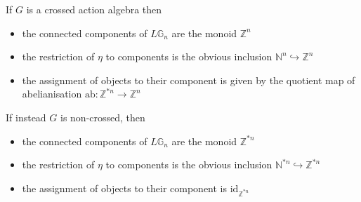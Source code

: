 \begin{cor}\label{crossconcomp} If $G$ is a crossed action algebra then
\begin{itemize} \itemsep0em
\item the connected components of $L\mathbb{G}_n$ are the monoid $\mathbb{Z}^n$
\item the restriction of $\eta$ to components is the obvious inclusion $\mathbb{N}^n \hookrightarrow \mathbb{Z}^n$
\item the assignment of objects to their component is given by the quotient map of abelianisation $\mathrm{ab}: \mathbb{Z}^{\ast n} \to \mathbb{Z}^n$
\end{itemize}
If instead $G$ is non-crossed, then
\begin{itemize} \itemsep0em
\item the connected components of $L\mathbb{G}_n$ are the monoid $\mathbb{Z}^{\ast n}$
\item the restriction of $\eta$ to components is the obvious inclusion $\mathbb{N}^{\ast n} \hookrightarrow \mathbb{Z}^{\ast n}$
\item the assignment of objects to their component is $\mathrm{id}_{\mathbb{Z}^{\ast n}}$
\end{itemize}
\end{cor}
